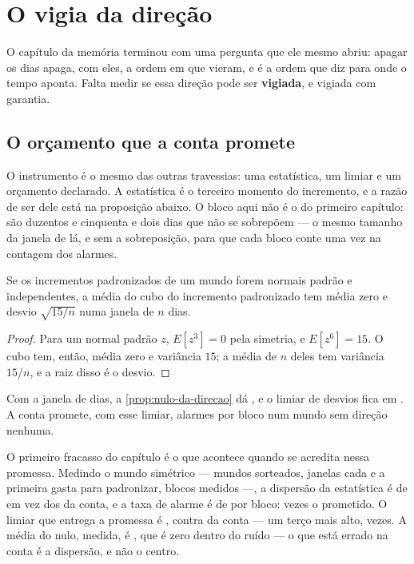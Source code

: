\chapter{O vigia da direção}\label{cap:direcao}

O capítulo da memória terminou com uma pergunta que ele mesmo abriu: apagar os dias apaga, com eles,
a ordem em que vieram, e é a ordem que diz para onde o tempo aponta. Falta medir se essa direção pode
ser \textbf{vigiada}, e vigiada com garantia.

\section{O orçamento que a conta promete}

O instrumento é o mesmo das outras travessias: uma estatística, um limiar e um orçamento declarado. A
estatística é o terceiro momento do incremento, e a razão de ser dele está na proposição abaixo. O bloco aqui não é o do
primeiro capítulo: são duzentos e cinquenta e dois dias que não se sobrepõem --- o mesmo tamanho da janela de lá, e sem
a sobreposição, para que cada bloco conte uma vez na contagem dos alarmes.

\begin{proposicao}\label{prop:nulo-da-direcao}
Se os incrementos padronizados de um mundo forem normais padrão e independentes, a média do cubo do
incremento padronizado tem média zero e desvio $\sqrt{15/n}$ numa janela de $n$ dias.
\end{proposicao}

\begin{proof}
Para um normal padrão $z$, $E[z^3] = 0$ pela simetria, e $E[z^6] = 15$. O cubo tem, então, média
zero e variância $15$; a média de $n$ deles tem variância $15/n$, e a raiz disso é o desvio.
\end{proof}

Com a janela de \numDirecaoJanela{} dias, a \cref{prop:nulo-da-direcao} dá \numDirecaoConta{}, e o limiar de
\numDirecaoZ{} desvios fica em \numDirecaoLimiar{}. A conta promete, com esse limiar,
\numDirecaoContaTaxa{} alarmes por bloco num mundo sem direção nenhuma.

O primeiro fracasso do capítulo é o que acontece quando se acredita nessa promessa. Medindo o mundo
simétrico --- \numDirecaoSementes{} mundos sorteados, \numDirecaoBlocosPorMundo{} janelas cada e a
primeira gasta para padronizar, \numDirecaoBlocosNulo{} blocos medidos ---, a dispersão da
estatística é de \numDirecaoNuloDispersao{} em vez dos \numDirecaoConta{} da conta, e a taxa de
alarme é de \numDirecaoNuloTaxa{} por bloco: \numDirecaoRazaoDasTaxas{} vezes o prometido. O limiar
que entrega a promessa é \numDirecaoLimiarMedido{}, contra \numDirecaoLimiar{} da conta --- um terço mais
alto, \numDirecaoLimiarMedidoRazao{} vezes. A média do nulo, medida, é \numDirecaoNuloMedia{}, que é zero
dentro do ruído --- o que está errado na conta é a dispersão, e não o centro.


